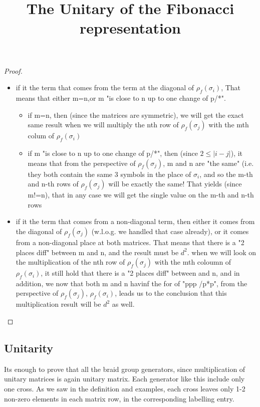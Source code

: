 \documentclass{article}
\begin{document}
\begin{proof}
\begin{itemize}
\item if it the term that comes from the term at the diagonal of $\rho_{f}(\sigma_{i})$, That means that either m=n,or m "is close to n up to one change of p/*". 
\begin{itemize}
\item if m=n, then (since the matrices are symmetric), we will get the exact same result when we will multiply the nth row of  $\rho_{f}(\sigma_{j})$ with the mth colum of $\rho_{f}(\sigma_{i})$
\item if m "is close to n up to one change of p/*", then (since $2 \leq |i - j| $), it means that from the perspective of $\rho_{f}(\sigma_{j})$, m and n are "the same" (i.e. they both contain the same 3 symbols in the place of $\sigma_{i}$, and so the m-th and n-th rows of $\rho_{f}(\sigma_{j})$  will be exactly the same! That yields (since m!=n), that in any case we will get the single value on the m-th and n-th rows
\end{itemize}
\item if it the term that comes from a non-diagonal term, then either it comes from the diagonal of $\rho_{f}(\sigma_{j})$ (w.l.o.g. we handled that case already), or it comes from a non-diagonal place at both matrices. That means that there is a "2 places diff" between m and n, and the result must be $d^{2}$. when we will look on the multiplication of the nth row of $\rho_{f}(\sigma_{j})$ with the mth coloumn of $\rho_{f}(\sigma_{i})$, it still hold that there is a "2 places diff" between  and n, and in addition, we now that both m and n havinf the for of "ppp /p*p", from the perspective of $\rho_{f}(\sigma_{j})$,  $\rho_{f}(\sigma_{i})$, leads us to the conclusion that this multiplication result will be $d^{2}$ as well.
\end{itemize}

\end{proof}

\subsection{Unitarity}
\title{The Unitary of the Fibonacci representation}
Its enough to prove that all the braid group generators, since multiplication of unitary matrices is again unitary matrix. Each generator like this include only one cross. As we saw in the definition and examples, each cross leaves only 1-2 non-zero elements in each matrix row, in the corresponding labelling entry.
\end{document}
